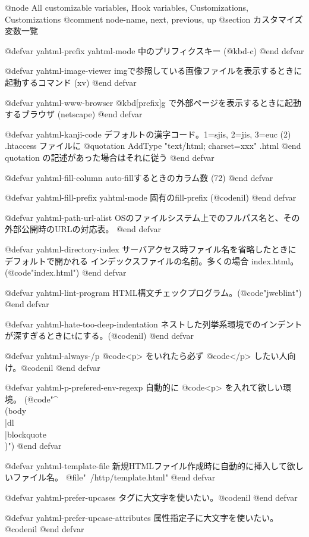 {{@node All customizable variables, Hook variables, Customizations, Customizations
@comment  node-name,  next,  previous,  up
@section カスタマイズ変数一覧

@defvar yahtml-prefix
yahtml-mode 中のプリフィクスキー (@kbd{\C-c})
@end defvar

@defvar yahtml-image-viewer
imgで参照している画像ファイルを表示するときに起動するコマンド (xv)
@end defvar

@defvar yahtml-www-browser
@kbd{[prefix]g} で外部ページを表示するときに起動するブラウザ (netscape)
@end defvar

@defvar yahtml-kanji-code
デフォルトの漢字コード。1=sjis, 2=jis, 3=euc (2)
.htaccess ファイルに
@quotation
 AddType "text/html; charset=xxx" .html
@end quotation
の記述があった場合はそれに従う
@end defvar

@defvar yahtml-fill-column
auto-fillするときのカラム数 (72)
@end defvar

@defvar yahtml-fill-prefix
yahtml-mode 固有のfill-prefix (@code{nil})
@end defvar

@defvar yahtml-path-url-alist
OSのファイルシステム上でのフルパス名と、その外部公開時のURLの対応表。
@end defvar

@defvar yahtml-directory-index
サーバアクセス時ファイル名を省略したときにデフォルトで開かれる
インデックスファイルの名前。多くの場合 index.html。(@code{"index.html"})
@end defvar

@defvar yahtml-lint-program
HTML構文チェックプログラム。(@code{"jweblint"})
@end defvar

@defvar yahtml-hate-too-deep-indentation
ネストした列挙系環境でのインデントが深すぎるときにtにする。(@code{nil})
@end defvar

@defvar yahtml-always-/p
@code{<p>} をいれたら必ず @code{</p>} したい人向け。@code{nil}
@end defvar

@defvar yahtml-p-prefered-env-regexp
自動的に @code{<p>} を入れて欲しい環境。
(@code{"^\\(body\\|dl\\|blockquote\\)"})
@end defvar

@defvar yahtml-template-file
新規HTMLファイル作成時に自動的に挿入して欲しいファイル名。
@file{"~/http/template.html"}
@end defvar

@defvar yahtml-prefer-upcases
タグに大文字を使いたい。@code{nil}
@end defvar

@defvar yahtml-prefer-upcase-attributes
属性指定子に大文字を使いたい。@code{nil}
@end defvar

}}
